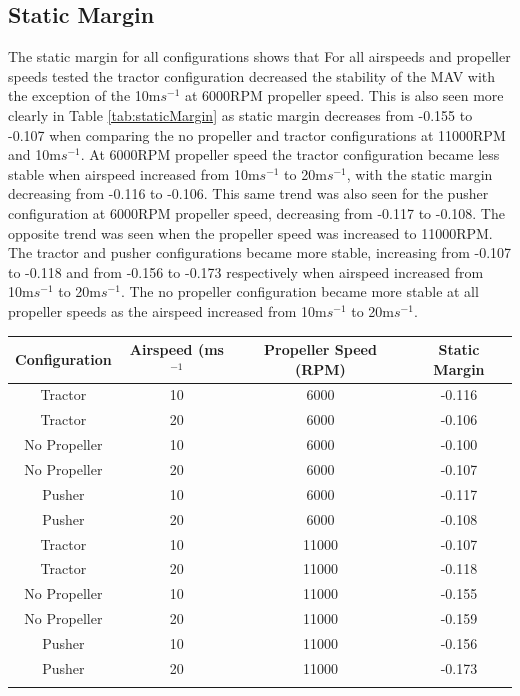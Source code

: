 \subsection{Static Margin}
The static margin for all configurations shows that  For all airspeeds and propeller speeds tested the tractor configuration decreased the stability of the MAV with the exception of the 10m$s^{-1}$ at 6000RPM propeller speed. This is also seen more clearly in Table \ref{tab:staticMargin} as static margin decreases from -0.155 to -0.107 when comparing the no propeller and tractor configurations at 11000RPM and  10m$s^{-1}$. At 6000RPM propeller speed the tractor configuration became less stable when airspeed increased from 10m$s^{-1}$ to 20m$s^{-1}$, with the static margin decreasing from -0.116 to -0.106. This same trend was also seen for the pusher configuration at 6000RPM propeller speed, decreasing from -0.117 to -0.108. The opposite trend was seen when the propeller speed was increased to 11000RPM. The tractor and pusher configurations became more stable, increasing from -0.107 to -0.118 and from -0.156 to -0.173 respectively when  airspeed increased from 10m$s^{-1}$ to 20m$s^{-1}$. The no propeller configuration became more stable at all propeller speeds as the airspeed increased from 10m$s^{-1}$ to 20m$s^{-1}$.


\begin{tabular}{ |c|c|c|c| }
 \hline

 \hline
 Configuration & Airspeed (ms$^{-1}$ &  Propeller Speed (RPM) & Static Margin\\
 \hline
 Tractor & 10 & 6000 & -0.116 \\
 Tractor & 20 & 6000 & -0.106\\
No Propeller & 10 & 6000 & -0.100\\
  No Propeller & 20 & 6000 & -0.107 \\
 Pusher & 10 & 6000 & -0.117 \\
  Pusher & 20 & 6000 & -0.108 \\
  \hline
 Tractor & 10 & 11000 & -0.107 \\
 Tractor & 20 & 11000 & -0.118\\
 No Propeller & 10 & 11000 & -0.155\\
 No Propeller& 20 & 11000 & -0.159\\
 Pusher & 10 & 11000 & -0.156 \\
 Pusher & 20 & 11000 & -0.173 \\
 \hline
 \label{tab:staticMargin}
\end{tabular}



